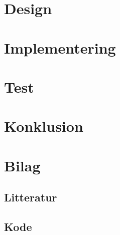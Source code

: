 \documentclass{article}
\begin{document}
\section{Design}

\section{Implementering}

\section{Test}

\section{Konklusion}

\section{Bilag}
\subsection{Litteratur}
\subsection{Kode}
\end{document}
